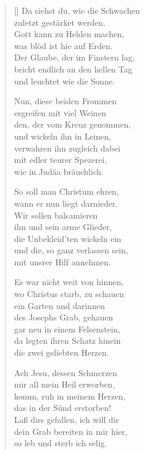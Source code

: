 \begin{multicols}{2}
\begin{verse}[\versewidth]
 Da siehst du, wie die Schwachen\\
zuletzt gestärket werden.\\
Gott kann zu Helden machen,\\
was blöd ist hie auf Erden.\\
Der Glaube, der im Finstern lag,\\
bricht endlich an den hellen Tag\\
und leuchtet wie die Sonne.

 Nun, diese beiden Frommen\\
ergreifen mit viel Weinen\\
den, der vom Kreuz genommen,\\
und wickeln ihn in Leinen,\\
verwahren ihn zugleich dabei\\
mit edler teurer Spezerei,\\
wie in Judäa bräuchlich.

 So soll man Christum ehren,\\
wann er nun liegt darnieder.\\
Wir sollen balsamieren\\
ihn und sein arme Glieder,\\
die Unbekleid'ten wickeln ein\\
und die, so ganz verlassen sein,\\
mit unsrer Hilf annehmen.

 Es war nicht weit von hinnen,\\
wo Christus starb, zu schauen\\
ein Garten und darinnen\\
des Josephs Grab, gehauen\\
gar neu in einem Felsenstein,\\
da legten ihren Schatz hinein\\
die zwei geliebten Herzen.

 Ach Jesu, dessen Schmerzen\\
mir all mein Heil erworben,\\
komm, ruh in meinem Herzen,\\
das in der Sünd erstorben!\\
Laß dirs gefallen, ich will dir\\
dein Grab bereiten in mir hier,\\
so leb und sterb ich selig.

\end{verse}
\end{multicols}
